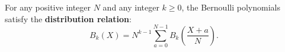 For any positive integer $N$ and any integer $k \geq 0$, the Bernoulli polynomials satisfy the \textbf{distribution relation}:
$$B_k(X) = N^{k-1} \sum_{a=0}^{N-1} B_k\!\left(\frac{X + a}{N}\right).$$
